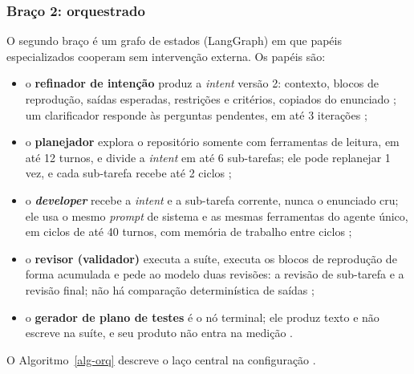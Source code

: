 \subsubsection{Braço 2: orquestrado}

O segundo braço é um grafo de estados (LangGraph) em que papéis especializados cooperam sem intervenção externa.  Os papéis são:

\begin{novobloco}
\begin{itemize}
    \item o \textbf{refinador de intenção} produz a \textit{intent} versão 2: contexto, blocos de reprodução, saídas esperadas, restrições e critérios, copiados do enunciado ; um clarificador responde às perguntas pendentes, em até 3 iterações ;
    \item o \textbf{planejador} explora o repositório somente com ferramentas de leitura, em até 12 turnos, e divide a \textit{intent} em até 6 sub-tarefas; ele pode replanejar 1 vez, e cada sub-tarefa recebe até 2 ciclos ;
    \item o \textbf{\textit{developer}} recebe a \textit{intent} e a sub-tarefa corrente, nunca o enunciado cru; ele usa o mesmo \textit{prompt} de sistema e as mesmas ferramentas do agente único, em ciclos de até 40 turnos, com memória de trabalho entre ciclos ;
    \item o \textbf{revisor (validador)} executa a suíte, executa os blocos de reprodução de forma acumulada e pede ao modelo duas revisões: a revisão de sub-tarefa e a revisão final; não há comparação determinística de saídas ;
    \item o \textbf{gerador de plano de testes} é o nó terminal; ele produz texto e não escreve na suíte, e seu produto não entra na medição .
\end{itemize}
\end{novobloco}

O Algoritmo~\ref{alg-orq} descreve o laço central na configuração .

